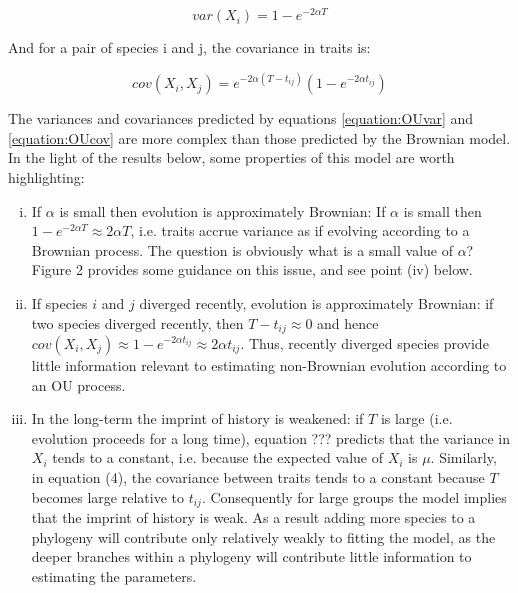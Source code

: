\documentclass[a4paper,12pt]{article}
\begin{document}
  \begin{equation}
    var(X_i) = 1 - e^{-2 \alpha T}
    \label{equation:OUvar} 
  \end{equation}

And for a pair of species i and j, the covariance in traits is:

  \begin{equation}
    cov(X_i, X_j) = e^{-2 \alpha (T - t_{ij})} (1 - e^{-2\alpha t_{ij}})
    \label{equation:OUcov} 
  \end{equation}

The variances and covariances predicted by equations \ref{equation:OUvar} and \ref{equation:OUcov} are more complex than those predicted by the Brownian model. In the light of the results below, some properties of this model are worth highlighting:

\begin{enumerate}[(i)]
  
  \item If $\alpha$ is small then evolution is approximately Brownian: If $\alpha$ is small then $1 - e^{-2\alpha T} \approx 2\alpha T$, i.e. traits accrue variance as if evolving according to a Brownian process. The question is obviously what is a small value of $\alpha$? Figure 2 provides some guidance on this issue, and see point (iv) below.\\ 

  \item If species $i$ and $j$ diverged recently, evolution is approximately Brownian: if two species diverged recently, then $T - t_{ij} \approx 0$ and hence $cov(X_i, X_j) \approx 1 - e^{-2\alpha t_{ij}} \approx 2\alpha t_{ij}$. Thus, recently diverged species provide little information relevant to estimating non-Brownian evolution according to an OU process. \\ 

  \item In the long-term the imprint of history is weakened: if $T$ is large (i.e. evolution proceeds for a long time), equation ??? predicts that the variance in $X_i$ tends to a constant, i.e. because the expected value of $X_i$ is $\mu$. Similarly, in equation (4), the covariance between traits tends to a constant because $T$ becomes large relative to $t_{ij}$. Consequently for large groups the model implies that the imprint of history is weak. As a result adding more species to a phylogeny will contribute only relatively weakly to fitting the model, as the deeper branches within a phylogeny will contribute little information to estimating the parameters.\\

\end{enumerate}
\end{document}
